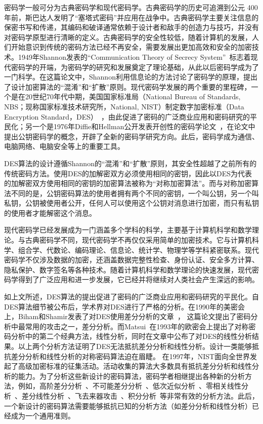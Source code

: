 \documentclass[a4paper,zihao=-4,AutoFakeBold]{ctexart}
\begin{document}
密码学一般可分为古典密码学和现代密码学。古典密码学的历史可追溯到公元 400 年前，斯巴达人发明了``塞塔式密码''并应用在战争中。古典密码学主要关注信息的保密书写和传递，其编码和破译通常依赖于设计者和敌手的创造力与技巧，并没有对密码学原型进行清晰的定义。古典密码学的安全性较低，随着计算机的发展，人们开始意识到传统的密码方法已经不再安全，需要发展出更加高效和安全的加密技术。1949年Shannon发表的``Communication Theory of Secrecy System''~\cite{Shannon49}标志着现代密码学的开端，为密码学的研究和发展奠定了理论基础，从此以后密码学成为了一门科学。在这篇论文中，Shannon利用信息论的方法讨论了密码学的原理，提出了设计加密算法的``混淆''和``扩散''原则。现代密码学发展的两个重要的里程碑，一个是在20世纪70年代中期，美国国家标准局（National Bureau of Standards, NBS；现称国家标准技术研究所，National, NIST）制定数字加密标准（Data Encryption Standard，DES）~\cite{DES}，由此促进了密码的广泛商业应用和密码研究的平民化；另一个是1976年Diffie和Hellman公开发表开创性的密码学论文~\cite{DiffieHellman}，在论文中提出公钥密码学的概念，开辟了全新的密码学研究方向。此后，密码学成为通信、电脑网络、电脑安全等上的重要工具。

DES算法的设计遵循Shannon的``混淆''和``扩散''原则，其安全性超越了之前所有的传统密码方法。使用DES的加解密双方必须使用相同的密钥，因此以DES为代表的加解密双方使用相同的密钥的加密算法被称为``对称加密算法''。而与对称加密算法不同的是，公钥密码算法的使用者拥有两个不同的密钥，一个叫公钥，另一个叫私钥，公钥被使用者公开，任何人可以使用这个公钥对消息进行加密，而只有私钥的使用者才能解密这个消息。

现代密码学已经发展成为一门涵盖多个学科的科学，主要基于计算机科学和数学理论。与古典密码学不同，现代密码学不再仅仅采用简单的加密技术。它与计算机科学、组合学、代数论、编码理论、信息论、统计学、物理学等学科紧密联系。现代密码学不仅涉及数据的加密，还涵盖数据完整性检查、身份认证、安全多方计算、隐私保护、数字签名等各种技术。随着计算机科学和数学理论的快速发展，现代密码学得到了广泛应用和进一步发展，它已经并将继续对人类社会产生深远的影响。

如上文所述，DES算法的提出促进了密码的广泛商业应用和密码研究的平民化。自DES算法细节被公布后，学术界对DES进行了严格的分析。在1990年的美密会上，Biham和Shamir发表了对DES使用差分分析的文章~\cite{BihamSCRYPTO90}， 这篇论文提出了密码分析中最常用的攻击之一，差分分析。而Matsui~\cite{M94}在1993年的欧密会上提出了对称密码分析中的第二个经典方法，线性分析，同时在文章中公布了对DES的线性分析结果。以上两个分析方法证明了DES无法抵抗差分分析和线性分析。设计一类能够抵抗差分分析和线性分析的对称密码算法迫在眉睫。
在1997年，NIST面向全世界发起了高级加密标准的征集活动。活动收集的算法大多数具有抵抗差分分析和线性分析的能力。为了分析这些新设计的密码算法，密码学者相继提出各种新的分析方法，例如，高阶差分分析~\cite{LRK95}、不可能差分分析~\cite{BihamBS99}、低次近似分析~\cite{GJloworderapproximation,KR96}、零相关线性分析~\cite{SunLGRL16}、差分线性分析~\cite{DLCTLi2019}、飞去来器攻击~\cite{BoomerangAttack99}、积分分析~\cite{IntegralCryptanalysis02}等非常有效的分析方法。此后，一个新设计的密码算法需要能够抵抗已知的分析方法（如差分分析和线性分析）已经成为一个通用准则。
\end{document}
